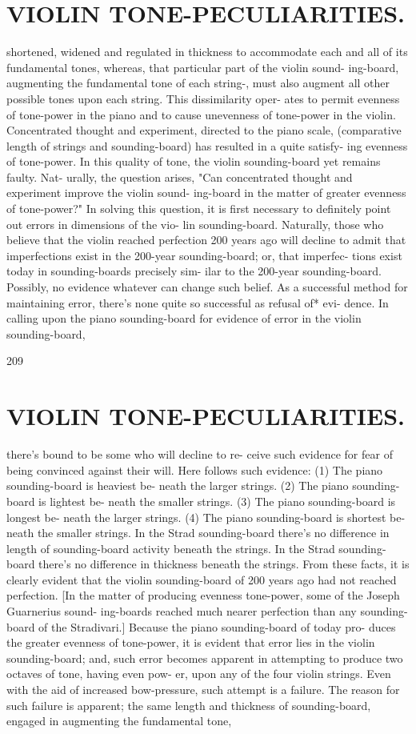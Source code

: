 \documentclass{article}
\begin{document}
\section*{VIOLIN TONE-PECULIARITIES.}
shortened, widened and regulated in thickness to accommodate each and all of its fundamental tones, whereas, that particular part of the violin sound- ing-board, augmenting the fundamental tone of each string-, must also augment all other possible tones upon each string. This dissimilarity oper- ates to permit evenness of tone-power in the piano and to cause unevenness of tone-power in the violin. Concentrated thought and experiment, directed to the piano scale, (comparative length of strings and sounding-board) has resulted in a quite satisfy- ing evenness of tone-power. In this quality of tone, the violin sounding-board yet remains faulty. Nat- urally, the question arises, "Can concentrated thought and experiment improve the violin sound- ing-board in the matter of greater evenness of tone-power?" In solving this question, it is first necessary to definitely point out errors in dimensions of the vio- lin sounding-board. Naturally, those who believe that the violin reached perfection 200 years ago will decline to admit that imperfections exist in the 200-year sounding-board; or, that imperfec- tions exist today in sounding-boards precisely sim- ilar to the 200-year sounding-board. Possibly, no evidence whatever can change such belief. As a successful method for maintaining error, there's none quite so successful as refusal of* evi- dence. In calling upon the piano sounding-board for evidence of error in the violin sounding-board,

209

\section*{VIOLIN TONE-PECULIARITIES.}
there's bound to be some who will decline to re- ceive such evidence for fear of being convinced against their will. Here follows such evidence: (1) The piano sounding-board is heaviest be- neath the larger strings. (2) The piano sounding-board is lightest be- neath the smaller strings. (3) The piano sounding-board is longest be- neath the larger strings. (4) The piano sounding-board is shortest be- neath the smaller strings. In the Strad sounding-board there's no difference in length of sounding-board activity beneath the strings. In the Strad sounding-board there's no difference in thickness beneath the strings. From these facts, it is clearly evident that the violin sounding-board of 200 years ago had not reached perfection. [In the matter of producing evenness tone-power, some of the Joseph Guarnerius sound- ing-boards reached much nearer perfection than any sounding-board of the Stradivari.] Because the piano sounding-board of today pro- duces the greater evenness of tone-power, it is evident that error lies in the violin sounding-board; and, such error becomes apparent in attempting to produce two octaves of tone, having even pow- er, upon any of the four violin strings. Even with the aid of increased bow-pressure, such attempt is a failure. The reason for such failure is apparent; the same length and thickness of sounding-board, engaged in augmenting the fundamental tone,
\end{document}
